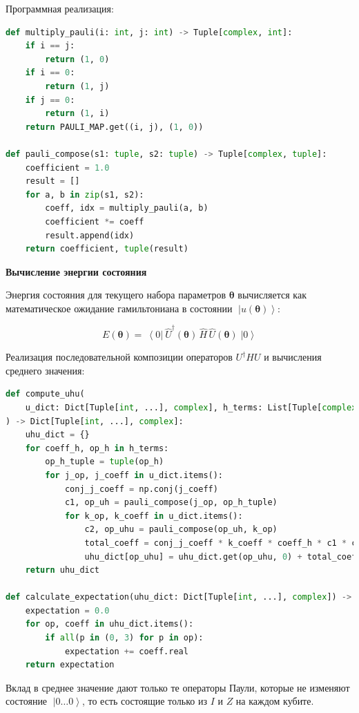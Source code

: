\documentclass[a4paper]{report}
\newcommand{\ket}[1] {\!\!\;\ensuremath{\left|#1\right\rangle}}
\newcommand{\bra}[1] {\!\!\:\ensuremath{\left\langle#1\right|\!\!\:}}
\begin{document}
Программная реализация:

\begin{lstlisting}[language=Python]
def multiply_pauli(i: int, j: int) -> Tuple[complex, int]:
    if i == j:
        return (1, 0)
    if i == 0:
        return (1, j)
    if j == 0:
        return (1, i)
    return PAULI_MAP.get((i, j), (1, 0))

def pauli_compose(s1: tuple, s2: tuple) -> Tuple[complex, tuple]:
    coefficient = 1.0
    result = []
    for a, b in zip(s1, s2):
        coeff, idx = multiply_pauli(a, b)
        coefficient *= coeff
        result.append(idx)
    return coefficient, tuple(result)
\end{lstlisting}

\noindent
\textbf{Вычисление энергии состояния}

Энергия состояния для текущего набора параметров $\bm\theta$ вычисляется как математическое ожидание гамильтониана в состоянии $\ket{u(\bm\theta)}$:

\begin{equation}
    E(\bm\theta) = \bra{0} \hat{U}^\dagger(\bm\theta)\, \hat{H} \, \hat{U}(\bm\theta) \ket{0}
\end{equation}

Реализация последовательной композиции операторов $U^\dagger H U$ и вычисления среднего значения:

\begin{lstlisting}[language=Python]
def compute_uhu(
    u_dict: Dict[Tuple[int, ...], complex], h_terms: List[Tuple[complex, List[int]]]
) -> Dict[Tuple[int, ...], complex]:
    uhu_dict = {}
    for coeff_h, op_h in h_terms:
        op_h_tuple = tuple(op_h)
        for j_op, j_coeff in u_dict.items():
            conj_j_coeff = np.conj(j_coeff)
            c1, op_uh = pauli_compose(j_op, op_h_tuple)
            for k_op, k_coeff in u_dict.items():
                c2, op_uhu = pauli_compose(op_uh, k_op)
                total_coeff = conj_j_coeff * k_coeff * coeff_h * c1 * c2
                uhu_dict[op_uhu] = uhu_dict.get(op_uhu, 0) + total_coeff
    return uhu_dict

def calculate_expectation(uhu_dict: Dict[Tuple[int, ...], complex]) -> float:
    expectation = 0.0
    for op, coeff in uhu_dict.items():
        if all(p in (0, 3) for p in op):
            expectation += coeff.real
    return expectation
\end{lstlisting}

Вклад в среднее значение дают только те операторы Паули, которые не изменяют состояние $\ket{0\ldots0}$, то есть состоящие только из $I$ и $Z$ на каждом кубите.
\end{document}
